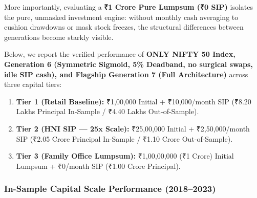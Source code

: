 \documentclass[11pt,a4paper]{article}
\begin{document}
More importantly, evaluating a \textbf{₹1 Crore Pure Lumpsum (₹0 SIP)} isolates the pure, unmasked investment engine: without monthly cash averaging to cushion drawdowns or mask stock freezes, the structural differences between generations become starkly visible.

Below, we report the verified performance of \textbf{ONLY NIFTY 50 Index, Generation 6 (Symmetric Sigmoid, 5\% Deadband, no surgical swaps, idle SIP cash), and Flagship Generation 7 (Full Architecture)} across three capital tiers:
\begin{enumerate}[leftmargin=*]
    \item \textbf{Tier 1 (Retail Baseline):} ₹1,00,000 Initial + ₹10,000/month SIP (₹8.20 Lakhs Principal In-Sample / ₹4.40 Lakhs Out-of-Sample).
    \item \textbf{Tier 2 (HNI SIP --- 25x Scale):} ₹25,00,000 Initial + ₹2,50,000/month SIP (₹2.05 Crore Principal In-Sample / ₹1.10 Crore Out-of-Sample).
    \item \textbf{Tier 3 (Family Office Lumpsum):} ₹1,00,00,000 (₹1 Crore) Initial Lumpsum + ₹0/month SIP (₹1.00 Crore Principal).
\end{enumerate}

\subsubsection{In-Sample Capital Scale Performance (2018--2023)}
\end{document}
